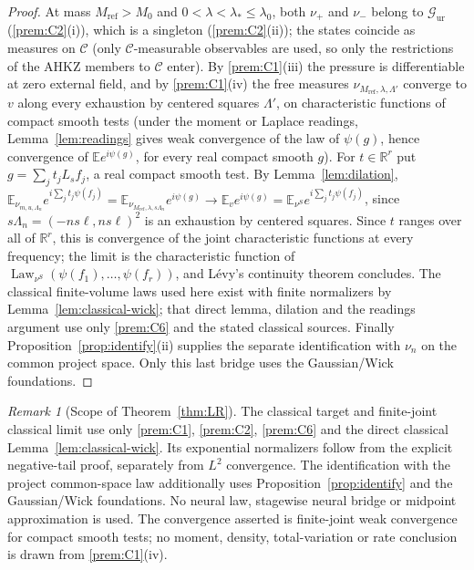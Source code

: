 \documentclass[11pt]{article}
\theoremstyle{plain}
\theoremstyle{definition}
\theoremstyle{remark}
\newtheorem{remark}[theorem]{Remark}
\newcommand{\R}{\mathbb{R}}
\newcommand{\E}{\mathbb{E}}
\newcommand{\cC}{\mathcal{C}}
\newcommand{\cG}{\mathcal{G}}
\DeclareMathOperator{\Law}{Law}
\begin{document}
\begin{proof}
\label{proof:LR-source}
At mass $M_{\mathrm{ref}}>M_0$ and $0<\lambda<\lambda_*\le\lambda_0$, both $\nu_+$ and $\nu_-$ belong to
$\cG_{\mathrm{ur}}$ (\ref{prem:C2}(i)), which is a singleton (\ref{prem:C2}(ii)); the
states coincide as measures on $\cC$ (only $\cC$-measurable observables are used, so
only the restrictions of the AHKZ members to $\cC$ enter). By \ref{prem:C1}(iii)
the pressure is differentiable at zero external field, and by \ref{prem:C1}(iv)
the free measures $\nu_{M_{\mathrm{ref}},\lambda,\Lambda'}$ converge to $v$ along every exhaustion by
centered squares $\Lambda'$, on characteristic functions of compact smooth tests
(under the moment or Laplace readings, Lemma~\ref{lem:readings} gives weak
convergence of the law of $\psi(g)$, hence convergence of $\E e^{i\psi(g)}$, for every
real compact smooth $g$). For $t\in\R^{r}$ put
$g=\sum_jt_jL_sf_j$, a real compact smooth test. By Lemma~\ref{lem:dilation},
$\E_{\nu_{m,u,\Lambda_n}}e^{i\sum_jt_j\psi(f_j)}=\E_{\nu_{M_{\mathrm{ref}},\lambda,s\Lambda_n}}e^{i\psi(g)}\to\E_ve^{i\psi(g)}
=\E_{\nu^{S}}e^{i\sum_jt_j\psi(f_j)}$, since $s\Lambda_n=(-ns\ell,ns\ell)^{2}$ is an exhaustion by
centered squares. Since $t$ ranges over all of $\R^{r}$, this is convergence of the
joint characteristic functions at every frequency; the limit is the
characteristic function of $\Law_{\nu^{S}}(\psi(f_1),\dots,\psi(f_r))$, and L\'evy's
continuity theorem concludes. The classical finite-volume laws used here
exist with finite normalizers by Lemma~\ref{lem:classical-wick}; that direct
lemma, dilation and the readings argument use only \ref{prem:C6} and the
stated classical sources.
\label{proof:LR-X}
Finally Proposition~\ref{prop:identify}(ii) supplies the separate identification
with $\nu_n$ on the common project space. Only this last bridge uses the
Gaussian/Wick foundations.
\end{proof}

\begin{remark}[Scope of Theorem~\ref{thm:LR}]\label{rem:LR-scope}
The classical target and finite-joint classical limit use only
\ref{prem:C1}, \ref{prem:C2}, \ref{prem:C6} and the direct classical
Lemma~\ref{lem:classical-wick}. Its exponential normalizers follow from
the explicit negative-tail proof, separately from $L^2$ convergence. The
identification with the project common-space law additionally uses
Proposition~\ref{prop:identify} and the Gaussian/Wick foundations. No
neural law, stagewise neural bridge or midpoint approximation is used.
The convergence asserted is finite-joint weak convergence for compact smooth
tests; no moment, density, total-variation or rate conclusion is drawn from
\ref{prem:C1}(iv).
\end{remark}
\end{document}
